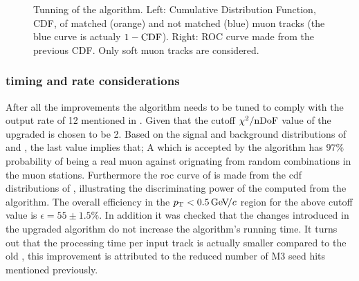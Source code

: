 \begin{figure}[t]
  \centering
  \begin{subfigure}{0.5\textwidth}
    \raggedright
    \scalebox{0.6}{}
    \caption{}
    \label{mvm_cdf}
  \end{subfigure}%
  \hfill%
  \begin{subfigure}{0.5\textwidth}
    \raggedleft
    \scalebox{0.6}{}
    \caption{}
    \label{mvm_roc}
  \end{subfigure}
  \caption{Tunning of the \mvTTm algorithm. Left: \chisq Cumulative Distribution Function, CDF,
           of matched (orange) and not matched (blue) muon tracks (the blue curve is actualy $1-{\rm CDF}$).
           Right: ROC curve made from the previous \chisq CDF. Only soft muon tracks are considered. }
 \label{mvm_tuning}
\end{figure}

\subsubsection{\hltone timing and rate considerations}
After all the improvements the \mvTTm algorithm needs to be tuned to comply with the \hltone output rate of 12
\khz mentioned in . Given that the cutoff $\chi^2/{\rm nDoF}$ value of the upgraded \mvTTm is chosen to be 2.
Based on the signal and background distributions of  and , the last value implies that;
A \veloTrack which is accepted by the \mvTTm algorithm has $97\%$ probability of being a real muon against orignating from
random combinations in the muon stations.
Furthermore the roc curve of  is made from the cdf distributions of , illustrating
the discriminating power of the \chisq computed from the \mvTTm algorithm.
The overall \mvTTm efficiency in the $\mbox{$p_{\rm T}$}<0.5{\mathrm{\,Ge\kern -0.1em V\!/}c}$ region for the above cutoff value is $\epsilon = 55 \pm 1.5 \%$.
In addition it was checked that the changes introduced in the upgraded \mvTTm algorithm
do not increase the algorithm's running time. It turns out that the processing time per input track is actually
smaller compared to the old \mvm, this improvement is attributed to the reduced number of M3 seed hits mentioned previously.

